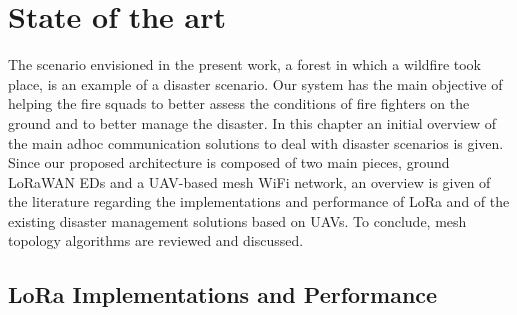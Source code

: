
\chapter{State of the art}
\label{chapter:stateoftheart}

The scenario envisioned in the present work, a forest in which a wildfire took place, is an example of a disaster scenario. Our system has the main objective of helping the fire squads to better assess the conditions of fire fighters on the ground and to better manage the disaster. In this chapter an initial overview of the main adhoc communication solutions to deal with disaster scenarios is given. Since our proposed architecture is composed of two main pieces, ground LoRaWAN \glspl{ED} and a UAV-based mesh WiFi network, an overview is given of the literature regarding the implementations and performance of LoRa and of the existing disaster management solutions based on UAVs. To conclude, mesh topology algorithms are reviewed and discussed.

\section{LoRa Implementations and Performance}

